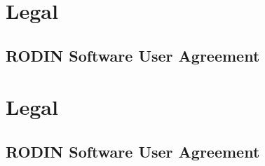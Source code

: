 \ifplastex
\section{Legal}
\label{sec:legal}

\subsection{RODIN Software User Agreement}
\label{sec:user-agreement}


\else
  \ifstandalone
  \section{Legal}
  \label{sec:legal}

  \subsection{RODIN Software User Agreement}
  \label{sec:user-agreement}

  
  \else
  \fi
\fi

